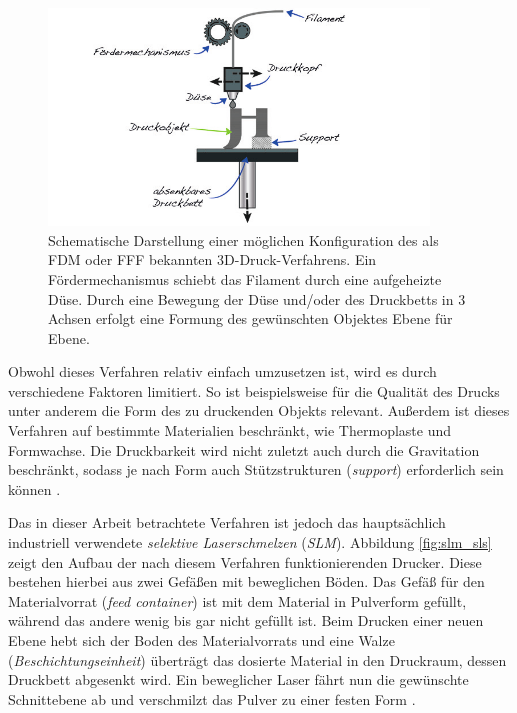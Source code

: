 		\begin{figure}[!ht]
			\centering
			\includegraphics[width=0.9\textwidth]{chapter/main/theory/img/fdm.png}
			\caption[Schematische Darstellung des FDM-/FFF-Verfahrens]{Schematische Darstellung
			einer möglichen Konfiguration des als FDM oder FFF bekannten 3D-Druck-Verfahrens. Ein
			Fördermechanismus schiebt das Filament durch eine aufgeheizte Düse. Durch eine
			Bewegung der Düse und/oder des Druckbetts in 3 Achsen erfolgt eine Formung
			des gewünschten Objektes Ebene für Ebene. \cite{horsch20143d}}
			\label{fig:fdm}
		\end{figure}

		Obwohl dieses Verfahren relativ einfach umzusetzen ist, wird es durch verschiedene
		Faktoren limitiert. So ist beispielsweise für die Qualität des Drucks unter anderem die
		Form des zu druckenden Objekts relevant. Außerdem ist dieses Verfahren auf bestimmte
		Materialien beschränkt, wie Thermoplaste und Formwachse. Die Druckbarkeit wird nicht
		zuletzt auch durch die Gravitation beschränkt, sodass je nach Form auch Stützstrukturen
		(\emph{support}) erforderlich sein können \cite{wikipedia2021fused}.

		Das in dieser Arbeit betrachtete Verfahren ist jedoch das hauptsächlich industriell
		verwendete \emph{selektive Laserschmelzen} (\emph{SLM}). Abbildung \ref{fig:slm_sls}
		zeigt den Aufbau der nach diesem Verfahren funktionierenden Drucker. Diese bestehen
		hierbei aus zwei Gefäßen mit beweglichen Böden. Das Gefäß für den Materialvorrat
		(\emph{feed container}) ist mit dem Material in Pulverform gefüllt, während das andere
		wenig bis gar nicht gefüllt ist. Beim Drucken einer neuen Ebene hebt sich der Boden des
		Materialvorrats und eine Walze (\emph{Beschichtungseinheit}) überträgt das dosierte
		Material in den Druckraum, dessen Druckbett abgesenkt wird. Ein beweglicher Laser fährt
		nun die gewünschte Schnittebene ab und verschmilzt das Pulver zu einer festen Form
		\cite{horsch20143d}.

